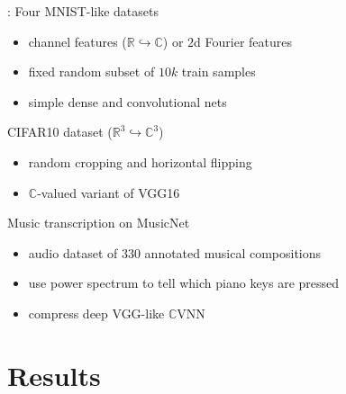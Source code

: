 \documentclass[handout]{beamer}
\newcommand{\real}{\mathbb{R}}
\newcommand{\cplx}{\mathbb{C}}
\begin{document}
\begin{frame}[t]{\insertsection: \insertsubsection}
  Four MNIST-like datasets
  \begin{itemize}
    \item channel features ($\real \hookrightarrow \cplx$) or $2$d Fourier features
    \item fixed random subset of $10k$ train samples
    \item simple dense and convolutional nets
  \end{itemize}

  \pause
  \medskip
  CIFAR10 dataset ($\real^3 \hookrightarrow \cplx^3$)
  \begin{itemize}
    \item random cropping and horizontal flipping
    \item $\cplx$-valued variant of VGG16\textsuperscript{\citep{simonyan_very_2015}}
  \end{itemize}

  \pause
  \medskip
  Music transcription on MusicNet\textsuperscript{\citep{thickstun_learning_2017}}
  \begin{itemize}
    \item audio dataset of $330$ annotated musical compositions
    \item use power spectrum to tell which piano keys are pressed
    \item compress deep VGG-like $\cplx$VNN\textsuperscript{\citep{trabelsi_deep_2018}}
  \end{itemize}

\end{frame}



\section{Results} %
\label{sec:results}
\end{document}
